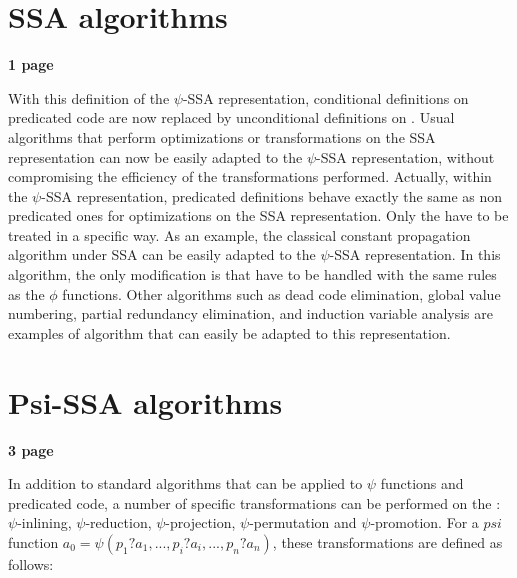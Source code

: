 \section{SSA algorithms}

\textbf{1 page}


With this definition of the $\psi$-SSA representation, conditional
definitions on predicated code are now replaced by unconditional
definitions on \psifuns. Usual algorithms that perform
optimizations or transformations on the SSA representation can now be
easily adapted to the $\psi$-SSA representation, without compromising
the efficiency of the transformations performed. Actually, within the
$\psi$-SSA representation, predicated definitions behave exactly the
same as non predicated ones for optimizations on the SSA
representation. Only the \psifuns have to be treated in a
specific way. As an example, the classical constant propagation
algorithm under SSA can be easily adapted to the $\psi$-SSA
representation. In this algorithm, the only modification is that
\psifuns have to be handled with the same rules as the $\phi$
functions. Other algorithms such as dead code elimination, global
value numbering, partial redundancy elimination, and induction
variable analysis are examples of algorithm that can easily be adapted
to this representation.

\section{Psi-SSA algorithms}

\textbf{3 page}


In addition to standard algorithms that can be applied to $\psi$
functions and predicated code, a number of specific transformations
can be performed on the \psifuns : $\psi$-inlining,
$\psi$-reduction, $\psi$-projection, $\psi$-permutation and
$\psi$-promotion. For a $psi$ function ${a_0 = \psi(p_1?a_1, ...,
  p_i?a_i, ..., p_n?a_n)}$, these transformations are defined as
follows:

